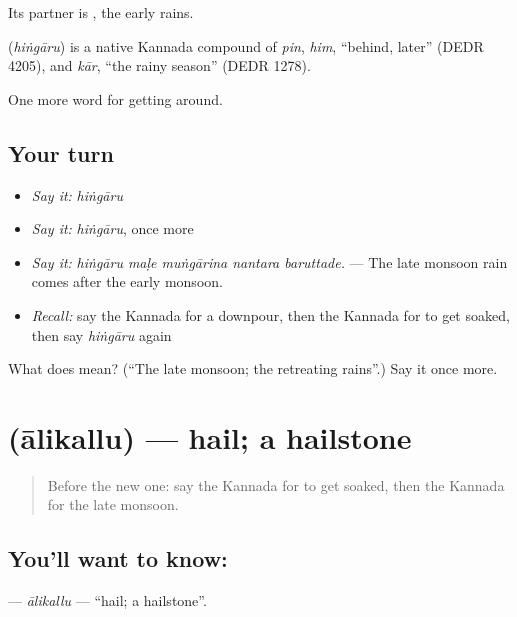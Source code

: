 Its partner is , the early rains.

\begin{cousinweb}
\textbf{} (\emph{hiṅgāru}) is a native Kannada compound of \emph{pin}, \emph{him}, \textquotedblleft{}behind, later\textquotedblright{} (DEDR 4205), and \emph{kār}, \textquotedblleft{}the rainy season\textquotedblright{} (DEDR 1278).
\end{cousinweb}

\begin{grammarlens}[title={What you've built}]
One more word for getting around.
\end{grammarlens}

\subsection*{Your turn}
\begin{itemize}
\raggedright
  \item \emph{Say it:} \emph{hiṅgāru}
  \item \emph{Say it:} \emph{hiṅgāru}, once more
  \item \emph{Say it:} \emph{hiṅgāru maḷe muṅgārina nantara baruttade.} — The late monsoon rain comes after the early monsoon.
  \item \emph{Recall:} say the Kannada for a downpour, then the Kannada for to get soaked, then say \emph{hiṅgāru} again
\end{itemize}

\begin{tcolorbox}[breakable,colback=teal!4,colframe=teal!35!black,title={Before you move on}]
What does  mean? (\textquotedblleft{}The late monsoon; the retreating rains\textquotedblright{}.) Say it once more.
\end{tcolorbox}
\section[\texorpdfstring{\kn{ಆಲಿಕಲ್ಲು} (ālikallu)}{ಆಲಿಕಲ್ಲು (ālikallu)}]{ (ālikallu) — hail; a hailstone}

\label{lesson:KA-C486-alikallu}



\begin{quote}
Before the new one: say the Kannada for to get soaked, then the Kannada for the late monsoon.
\end{quote}

\subsection*{You'll want to know: }
\textbf{} — \emph{ālikallu} — \textquotedblleft{}hail; a hailstone\textquotedblright{}.

